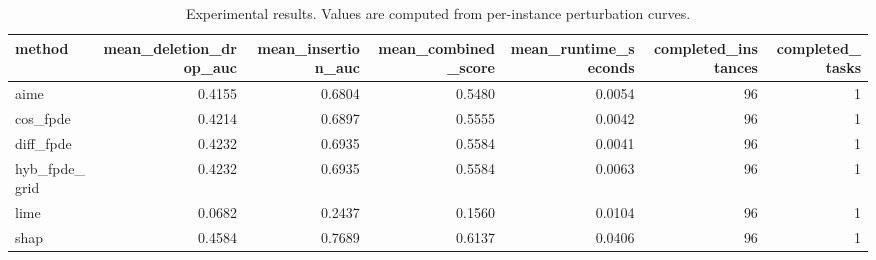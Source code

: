 \begin{table}[t]
\caption{Experimental results. Values are computed from per-instance perturbation curves.}
\label{tab:main_results_computed}
\centering
\begin{tabular}{lrrrrrr}
\toprule
method & mean\_deletion\_drop\_auc & mean\_insertion\_auc & mean\_combined\_score & mean\_runtime\_seconds & completed\_instances & completed\_tasks \\
\midrule
aime & 0.4155 & 0.6804 & 0.5480 & 0.0054 & 96 & 1 \\
cos\_fpde & 0.4214 & 0.6897 & 0.5555 & 0.0042 & 96 & 1 \\
diff\_fpde & 0.4232 & 0.6935 & 0.5584 & 0.0041 & 96 & 1 \\
hyb\_fpde\_grid & 0.4232 & 0.6935 & 0.5584 & 0.0063 & 96 & 1 \\
lime & 0.0682 & 0.2437 & 0.1560 & 0.0104 & 96 & 1 \\
shap & 0.4584 & 0.7689 & 0.6137 & 0.0406 & 96 & 1 \\
\bottomrule
\end{tabular}

\end{table}
